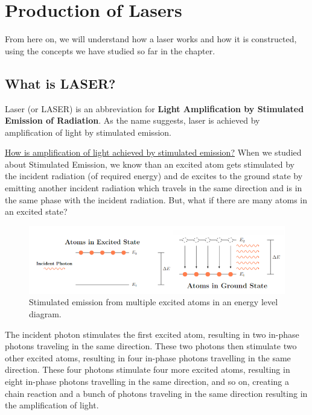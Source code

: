 \documentclass[12pt]{article}
\begin{document}
\section{Production of Lasers}

From here on, we will understand how a laser works and how it is constructed, using the concepts we have studied so far in the chapter.

\subsection{What is LASER?}

Laser (or LASER) is an abbreviation for \textbf{Light Amplification by Stimulated Emission of Radiation}. As the name suggests, laser is achieved by amplification of light by stimulated emission. \vspace{.2cm}

\uline{How is amplification of light achieved by stimulated emission?} When we studied about Stimulated Emission, we know than an excited atom gets stimulated by the incident radiation (of required energy) and de excites to the ground state by emitting another incident radiation which travels in the same direction and is in the same phase with the incident radiation. But, what if there are many atoms in an excited state?

\begin{figure}[H]
    \centering
    \includegraphics[scale=.78]{./img/07_amplification.png}
    \caption{Stimulated emission from multiple excited atoms in an energy level diagram.}
\end{figure}

The incident photon stimulates the first excited atom, resulting in two in-phase photons traveling in the same direction. These two photons then stimulate two other excited atoms, resulting in four in-phase photons travelling in the same direction. These four photons stimulate four more excited atoms, resulting in eight in-phase photons travelling in the same direction, and so on, creating a chain reaction and a bunch of photons traveling in the same direction resulting in the amplification of light. \vspace{.3cm}
\end{document}
